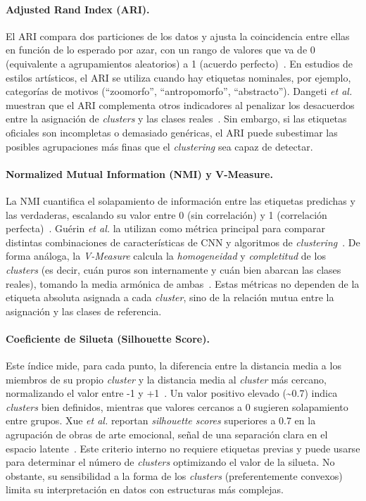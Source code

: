 \paragraph{Adjusted Rand Index (ARI).} El ARI compara dos particiones de los datos y ajusta la coincidencia entre ellas en función de lo esperado por azar, con un rango de valores que va de 0 (equivalente a agrupamientos aleatorios) a 1 (acuerdo perfecto)~\cite{gultepe2018,guerin2018}.
En estudios de estilos artísticos, el ARI se utiliza cuando hay etiquetas nominales, por ejemplo, categorías de motivos (“zoomorfo”, “antropomorfo”, “abstracto”).
Dangeti \textit{et al.} muestran que el ARI complementa otros indicadores al penalizar los desacuerdos entre la asignación de \textit{clusters} y las clases reales~\cite{dangeti2024}.
Sin embargo, si las etiquetas oficiales son incompletas o demasiado genéricas, el ARI puede subestimar las posibles agrupaciones más finas que el \textit{clustering} sea capaz de detectar.

\paragraph{Normalized Mutual Information (NMI) y V-Measure.}
La NMI cuantifica el solapamiento de información entre las etiquetas predichas y las verdaderas, escalando su valor entre 0 (sin correlación) y 1 (correlación perfecta)~\cite{dangeti2024,guerin2018}.
Guérin \textit{et al.} la utilizan como métrica principal para comparar distintas combinaciones de características de CNN y algoritmos de \textit{clustering}~\cite{guerin2018}.
De forma análoga, la \textit{V-Measure} calcula la \emph{homogeneidad} y \emph{completitud} de los \textit{clusters} (es decir, cuán puros son internamente y cuán bien abarcan las clases reales), tomando la media armónica de ambas~\cite{li2010}.
Estas métricas no dependen de la etiqueta absoluta asignada a cada \textit{cluster}, sino de la relación mutua entre la asignación y las clases de referencia.

\paragraph{Coeficiente de Silueta (Silhouette Score).}
Este índice mide, para cada punto, la diferencia entre la distancia media a los miembros de su propio \textit{cluster} y la distancia media al \textit{cluster} más cercano, normalizando el valor entre -1 y +1~\cite{dangeti2024,gultepe2018}.
Un valor positivo elevado (\textasciitilde 0.7) indica \textit{clusters} bien definidos, mientras que valores cercanos a 0 sugieren solapamiento entre grupos.
Xue \textit{et al.} reportan \textit{silhouette scores} superiores a 0.7 en la agrupación de obras de arte emocional, señal de una separación clara en el espacio latente~\cite{gultepe2018}.
Este criterio interno no requiere etiquetas previas y puede usarse para determinar el número de \textit{clusters} optimizando el valor de la silueta.
No obstante, su sensibilidad a la forma de los \textit{clusters} (preferentemente convexos) limita su interpretación en datos con estructuras más complejas.


